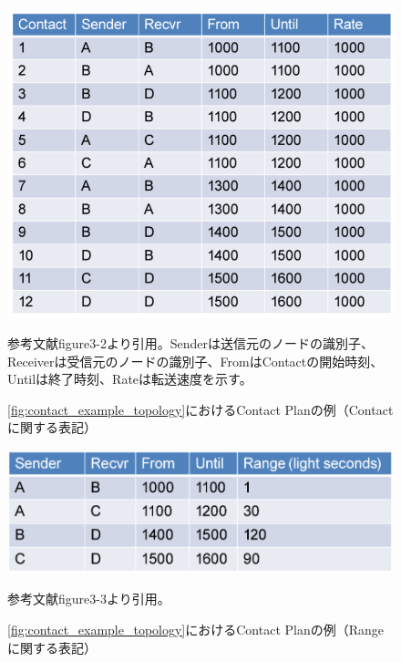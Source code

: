\begin{figure}[tbh]
    \centering
    \includegraphics[width=0.5\textheight]{img/contact_example_contactplan.pdf}
    \caption{\ref{fig:contact_example_topology}におけるContact Planの例（Contactに関する表記）}
    \label{fig:contact_example_contactplan}
    \begin{minipage}{\textwidth}
        \raggedright
        \vspace{3mm}
        参考文献\cite{schedule_aware_bundle_routing}figure3-2より引用。Senderは送信元のノードの識別子、Receiverは受信元のノードの識別子、FromはContactの開始時刻、Untilは終了時刻、Rateは転送速度を示す。
    \end{minipage}
\end{figure}
\begin{figure}[tbh]
    \centering
    \includegraphics[width=0.5\textheight]{img/contact_example_contactrange.pdf}
    \caption{\ref{fig:contact_example_topology}におけるContact Planの例（Rangeに関する表記）}
    \label{fig:contact_example_contactrange}
    \begin{minipage}{\textwidth}
        \centering
        \vspace{3mm}
        参考文献\cite{schedule_aware_bundle_routing}figure3-3より引用。
    \end{minipage}
\end{figure}
